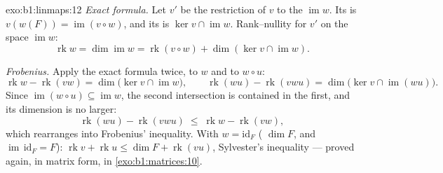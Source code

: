 \begin{solution}{exo:b1:linmaps:12}
\emph{Exact formula.} Let $v'$ be the restriction of $v$ to the
 $\operatorname{im} w$. Its  is $v(w(F)) =
\operatorname{im}(v \circ w)$, and its  is $\ker v \cap
\operatorname{im} w$. Rank--nullity for $v'$ on the space
$\operatorname{im} w$:
\[
\operatorname{rk} w = \dim\operatorname{im} w
= \operatorname{rk}(v \circ w) + \dim(\ker v \cap
\operatorname{im} w) .
\]

\emph{Frobenius.} Apply the exact formula twice, to $w$ and to
$w \circ u$:
\[
\operatorname{rk} w - \operatorname{rk}(vw)
= \dim\bigl(\ker v \cap \operatorname{im} w\bigr),
\qquad
\operatorname{rk}(wu) - \operatorname{rk}(vwu)
= \dim\bigl(\ker v \cap \operatorname{im}(wu)\bigr) .
\]
Since $\operatorname{im}(w \circ u) \subseteq \operatorname{im}
w$, the second intersection is contained in the first, and its
dimension is no larger:
\[
\operatorname{rk}(wu) - \operatorname{rk}(vwu)
\;\leq\; \operatorname{rk} w - \operatorname{rk}(vw) ,
\]
which rearranges into Frobenius' inequality. With $w =
\mathrm{id}_F$ ( $\dim F$, and $\operatorname{im}\,
\mathrm{id}_F = F$): $\operatorname{rk} v + \operatorname{rk} u
\leq \dim F + \operatorname{rk}(vu)$, Sylvester's inequality ---
proved again, in matrix form, in \cref{exo:b1:matrices:10}.
\end{solution}

